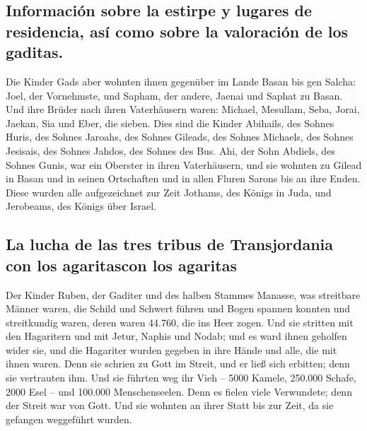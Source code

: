 \hypertarget{informaciuxf3n-sobre-la-estirpe-y-lugares-de-residencia-asuxed-como-sobre-la-valoraciuxf3n-de-los-gaditas.}{%
\subsection{Información sobre la estirpe y lugares de residencia, así
como sobre la valoración de los
gaditas.}\label{informaciuxf3n-sobre-la-estirpe-y-lugares-de-residencia-asuxed-como-sobre-la-valoraciuxf3n-de-los-gaditas.}}

 Die Kinder Gads aber wohnten ihnen gegenüber im Lande
Basan bis gen Salcha:  Joel, der Vornehmste, und Sapham,
der andere, Jaenai und Saphat zu Basan.  Und ihre Brüder
nach ihren Vaterhäusern waren: Michael, Mesullam, Seba, Jorai, Jaekan,
Sia und Eber, die sieben.  Dies sind die Kinder Abihails,
des Sohnes Huris, des Sohnes Jaroahs, des Sohnes Gileads, des Sohnes
Michaels, des Sohnes Jesisais, des Sohnes Jahdos, des Sohnes des Bus.
 Ahi, der Sohn Abdiels, des Sohnes Gunis, war ein
Oberster in ihren Vaterhäusern,  und sie wohnten zu
Gilead in Basan und in seinen Ortschaften und in allen Fluren Sarons bis
an ihre Enden.  Diese wurden alle aufgezeichnet zur Zeit
Jothams, des Königs in Juda, und Jerobeams, des Königs über Israel.

\hypertarget{la-lucha-de-las-tres-tribus-de-transjordania-con-los-agaritascon-los-agaritas}{%
\subsection{La lucha de las tres tribus de Transjordania con los
agaritascon los
agaritas}\label{la-lucha-de-las-tres-tribus-de-transjordania-con-los-agaritascon-los-agaritas}}

 Der Kinder Ruben, der Gaditer und des halben Stammes
Manasse, was streitbare Männer waren, die Schild und Schwert führen und
Bogen spannen konnten und streitkundig waren, deren waren 44.760, die
ins Heer zogen.  Und sie stritten mit den Hagaritern und
mit Jetur, Naphis und Nodab;  und es ward ihnen geholfen
wider sie, und die Hagariter wurden gegeben in ihre Hände und alle, die
mit ihnen waren. Denn sie schrien zu Gott im Streit, und er ließ sich
erbitten; denn sie vertrauten ihm.  Und sie führten weg
ihr Vieh -- 5000 Kamele, 250.000 Schafe, 2000 Esel -- und 100.000
Menschenseelen.  Denn es fielen viele Verwundete; denn
der Streit war von Gott. Und sie wohnten an ihrer Statt bis zur Zeit, da
sie gefangen weggeführt wurden.

